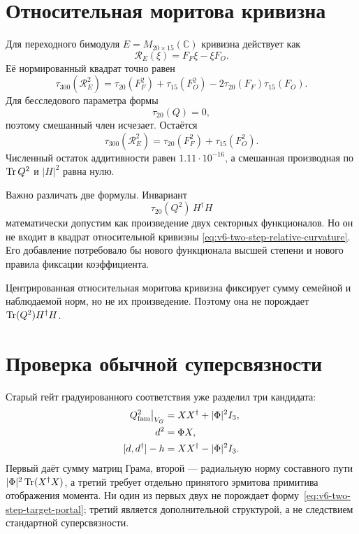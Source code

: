 \section{Относительная моритова кривизна}

Для переходного бимодуля $E=M_{20\times15}(\mathbb C)$ кривизна действует
как
\begin{equation}
 \mathcal R_E(\xi)=F_F\xi-\xi F_O.
\end{equation}
Её нормированный квадрат точно равен
\begin{equation}
 \tau_{300}(\mathcal R_E^2)
 =\tau_{20}(F_F^2)+\tau_{15}(F_O^2)
 -2\tau_{20}(F_F)\tau_{15}(F_O).
 \label{eq:v6-two-step-relative-curvature}
\end{equation}
Для бесследового параметра формы
\begin{equation}
 \tau_{20}(Q)=0,
\end{equation}
поэтому смешанный член исчезает. Остаётся
\begin{equation}
 \tau_{300}(\mathcal R_E^2)
 =\tau_{20}(F_F^2)+\tau_{15}(F_O^2).
 \label{eq:v6-two-step-additive-curvature}
\end{equation}
Численный остаток аддитивности равен $1.11\cdot10^{-16}$, а смешанная
производная по $\operatorname{Tr} Q^2$ и $|H|^2$ равна нулю.

Важно различать две формулы. Инвариант
\begin{equation}
 \tau_{20}(Q^2)\,H^\dagger H
\end{equation}
математически допустим как произведение двух секторных функционалов. Но
он не входит в квадрат относительной кривизны
\eqref{eq:v6-two-step-relative-curvature}. Его добавление потребовало бы
нового функционала высшей степени и нового правила фиксации коэффициента.

\begin{proposition}
Центрированная относительная моритова кривизна фиксирует сумму семейной и
наблюдаемой норм, но не их произведение. Поэтому она не порождает
$\operatorname{Tr}(Q^2)H^\dagger H$.
\end{proposition}

\section{Проверка обычной суперсвязности}

Старый гейт градуированного соответствия уже разделил три кандидата:
\begin{align}
 Q_{\rm fam}^2\big|_{V_G}
 &=XX^\dagger+|\Phi|^2I_3,\nonumber\\
 d^2&=\Phi X,\nonumber\\
 [d,d^\dagger]-h
 &=XX^\dagger-|\Phi|^2I_3.
\end{align}
Первый даёт сумму матриц Грама, второй --- радиальную норму составного
пути $|\Phi|^2\operatorname{Tr}(X^\dagger X)$, а третий требует отдельно принятого
эрмитова примитива отображения момента. Ни один из первых двух не
порождает форму~\eqref{eq:v6-two-step-target-portal}; третий является
дополнительной структурой, а не следствием стандартной суперсвязности.


